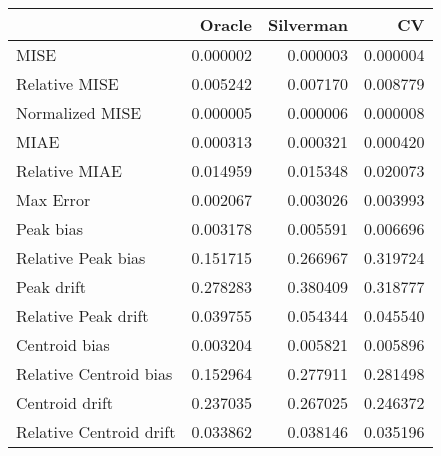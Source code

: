 \begin{tabular}{lrrr}
  \hline
 & Oracle & Silverman & CV \\ 
  \hline
MISE & 0.000002 & 0.000003 & 0.000004 \\ 
  Relative MISE & 0.005242 & 0.007170 & 0.008779 \\ 
  Normalized MISE & 0.000005 & 0.000006 & 0.000008 \\ 
  MIAE & 0.000313 & 0.000321 & 0.000420 \\ 
  Relative MIAE & 0.014959 & 0.015348 & 0.020073 \\ 
  Max Error & 0.002067 & 0.003026 & 0.003993 \\ 
  Peak bias & 0.003178 & 0.005591 & 0.006696 \\ 
  Relative Peak bias & 0.151715 & 0.266967 & 0.319724 \\ 
  Peak drift & 0.278283 & 0.380409 & 0.318777 \\ 
  Relative Peak drift & 0.039755 & 0.054344 & 0.045540 \\ 
  Centroid bias & 0.003204 & 0.005821 & 0.005896 \\ 
  Relative Centroid bias & 0.152964 & 0.277911 & 0.281498 \\ 
  Centroid drift & 0.237035 & 0.267025 & 0.246372 \\ 
  Relative Centroid drift & 0.033862 & 0.038146 & 0.035196 \\ 
   \hline
\end{tabular}
